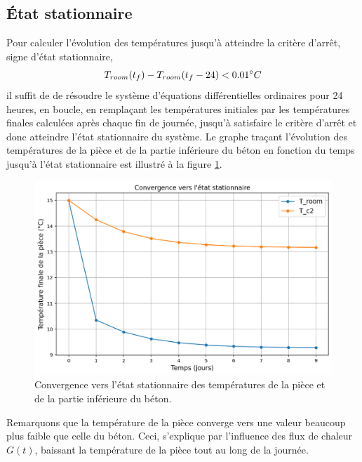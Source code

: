 \documentclass[12pt]{article}
\begin{document}
    \subsection{État stationnaire}\label{section:EtatStationnaire}
        Pour calculer l'évolution des températures jusqu'à atteindre la critère d'arrêt, signe d'état stationnaire,
        \begin{equation}
            T_{room}(t_f) - T_{room}(t_f - 24) < 0.01\degree C
        \end{equation}
        il suffit de de résoudre le système d'équations différentielles ordinaires pour 24 heures, en boucle, en remplaçant les températures initiales par les températures finales calculées après chaque fin de journée, jusqu'à satisfaire le critère d'arrêt et donc atteindre l'état stationnaire du système. Le graphe traçant l’évolution des températures de la pièce et de la partie inférieure du béton en fonction du temps jusqu’à l’état stationnaire est illustré à la figure \ref{fig:convergence}.
        \begin{figure}
            \centering
            \includegraphics[width=0.91\linewidth]{Rapport/figures/Convergence.png}
            \caption{Convergence vers l'état stationnaire des températures de la pièce et de la partie inférieure du béton.}
            \label{fig:convergence}
        \end{figure}
        Remarquons que la température de la pièce converge vers une valeur beaucoup plus faible que celle du béton. Ceci, s'explique par l'influence des flux de chaleur $G(t)$, baissant la température de la pièce tout au long de la journée.
\end{document}
